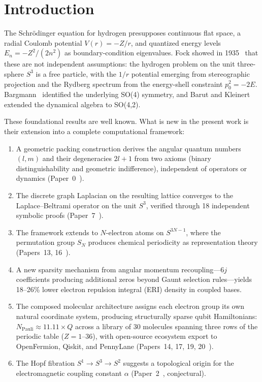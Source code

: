 \documentclass[aps,pra,twocolumn,superscriptaddress,longbibliography]{revtex4-2}
\begin{document}

\section{Introduction}
\label{sec:introduction}

The Schr\"odinger equation for hydrogen presupposes continuous flat
space, a radial Coulomb potential $V(r) = -Z/r$, and quantized energy
levels $E_n = -Z^2/(2n^2)$ as boundary-condition eigenvalues.  Fock
showed in 1935~\cite{Fock1935} that these are not independent
assumptions: the hydrogen problem on the unit three-sphere $S^3$ is a
free particle, with the $1/r$ potential emerging from stereographic
projection and the Rydberg spectrum from the energy-shell constraint
$p_0^2 = -2E$.  Bargmann~\cite{Bargmann1936} identified the underlying
SO(4) symmetry, and Barut and Kleinert~\cite{BarutKleinert1967}
extended the dynamical algebra to SO(4,2).

These foundational results are well known.  What is new in the present
work is their extension into a complete computational framework:
\begin{enumerate}
\item A geometric packing construction derives the angular quantum
  numbers $(l, m)$ and their degeneracies $2l+1$ from two axioms
  (binary distinguishability and geometric indifference), independent
  of operators or dynamics (Paper~0~\cite{Paper0}).
\item The discrete graph Laplacian on the resulting lattice converges
  to the Laplace--Beltrami operator on the unit $S^3$, verified
  through 18 independent symbolic proofs (Paper~7~\cite{Paper7}).
\item The framework extends to $N$-electron atoms on $S^{3N-1}$, where
  the permutation group $S_N$ produces chemical periodicity as
  representation theory (Papers~13, 16~\cite{Paper13,Paper16}).
\item A new sparsity mechanism from angular momentum
  recoupling---6$j$ coefficients producing additional zeros beyond
  Gaunt selection rules---yields 18--26\% lower electron repulsion
  integral (ERI) density in coupled bases.
\item The composed molecular architecture assigns each electron group
  its own natural coordinate system, producing structurally sparse qubit
  Hamiltonians: $N_{\text{Pauli}} \approx 11.11 \times Q$ across a
  library of 30 molecules spanning three rows of the periodic table
  ($Z = 1$--36), with open-source ecosystem export to OpenFermion,
  Qiskit, and PennyLane
  (Papers~14, 17, 19, 20~\cite{Paper14,Paper17,Paper19,Paper20}).
\item The Hopf fibration $S^1 \to S^3 \to S^2$ suggests a topological
  origin for the electromagnetic coupling constant $\alpha$
  (Paper~2~\cite{Paper2}, conjectural).
\end{enumerate}
\end{document}
